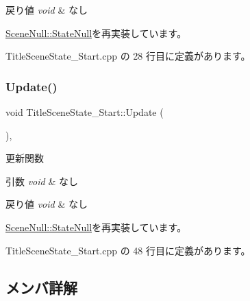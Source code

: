 \begin{DoxyRetVals}{戻り値}
{\em void} & なし \\
\hline
\end{DoxyRetVals}


\mbox{\hyperlink{class_scene_null_1_1_state_null_ac0b3f1adf01b580144337e37a847131f}{Scene\+Null\+::\+State\+Null}}を再実装しています。



 Title\+Scene\+State\+\_\+\+Start.\+cpp の 28 行目に定義があります。

\mbox{\label{class_title_scene_state___start_a2e98cf6810711b58766d7147168d02eb}} 
\subsubsection{\texorpdfstring{Update()}{Update()}}
{\footnotesize\ttfamily void Title\+Scene\+State\+\_\+\+Start\+::\+Update (\begin{DoxyParamCaption}{ }\end{DoxyParamCaption})\hspace{0.3cm}{\ttfamily [override]}, {\ttfamily [virtual]}}



更新関数 


\begin{DoxyParams}{引数}
{\em void} & なし \\
\hline
\end{DoxyParams}

\begin{DoxyRetVals}{戻り値}
{\em void} & なし \\
\hline
\end{DoxyRetVals}


\mbox{\hyperlink{class_scene_null_1_1_state_null_a835f82c22afb290eca79460450088baf}{Scene\+Null\+::\+State\+Null}}を再実装しています。



 Title\+Scene\+State\+\_\+\+Start.\+cpp の 48 行目に定義があります。



\subsection{メンバ詳解}
\mbox{\label{class_title_scene_state___start_a1a0dde9e9834cb18e0cf1e1ab12a2129}} 
